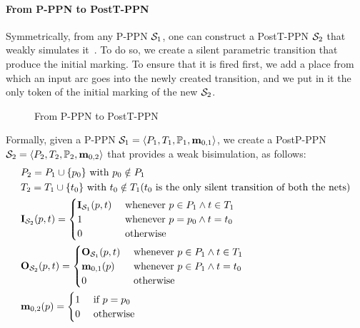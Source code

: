 \paragraph{From P-PPN to PostT-PPN}
\label{sec:p-ppn-to-postt-ppn}

Symmetrically, from any P-PPN $\namePPN[1]$, one can construct a PostT-PPN $\namePPN[2]$ that weakly simulates it~\citep{David17}.
To do so, we create a silent parametric transition that produce the initial marking.
To ensure that it is fired first, we add a place from which an input arc goes into the newly created transition, and we put in it the only token of the initial marking of the new $\namePPN[2]$.

\begin{figure}[htbp]
  \centering
  
  \par
  \caption{From P-PPN to PostT-PPN}
  \label{fig:pppn-to-posttppn}
\end{figure}

Formally, given a P-PPN $\defPPN[1]$, we create a PostP-PPN $\defPPN[2]$ that provides a weak bisimulation, as follows:
\begin{align*}
  &\places_2 = \places_1 \cup           \{ p_0 \}
    \text{ with } p_0 \notin \places_1 \\
  &\transitions_2 = \transitions_1 \cup \{ t_0 \}
    \text{ with } t_0 \notin \transitions_1 \text{($t_0$ is  the only silent transition of both the nets)} \\
  &\inm[\namePPN[2]][p,t] = \begin{cases}
      \inm[\namePPN[1]][p,t] &\text{ whenever } p \in \places_1 \wedge t \in \transitions_1 \\
      1 &\text{ whenever } p = p_0 \wedge t = t_0 \\
      0 &\tothrw
    \end{cases} \\
  &\outm[\namePPN[2]][p,t] = \begin{cases}
      \outm[\namePPN[1]][p,t] &\text{ whenever } p \in \places_1 \wedge t \in \transitions_1 \\
      \mar_{0,1}(p) &\text{ whenever } p \in \places_1 \wedge t = t_0 \\
      0 &\tothrw
    \end{cases} \\
  &\mar_{0,2}(p) = \begin{cases}
      1 & \tif p = p_0 \\
      0 & \tothrw
    \end{cases}
\end{align*}

